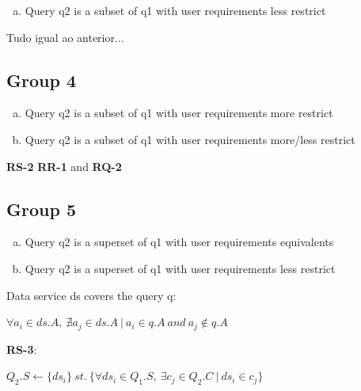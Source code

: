 \begin{enumerate}[b)]
\item Query q2 is a subset of q1 with user requirements less restrict
\end{enumerate}

\begin{definition}
Tudo igual ao anterior...
\end{definition}

\subsection{Group 4}

\begin{enumerate}[a)]
\item Query q2 is a subset of q1 with user requirements more restrict
\item Query q2 is a subset of q1 with user requirements more/less restrict
\end{enumerate}

\begin{definition}
\textbf{RS-2} \textbf{RR-1} and \textbf{RQ-2}
\end{definition}

\subsection{Group 5}
\begin{enumerate}[a)]
\item Query q2 is a superset of q1 with user requirements equivalents
\item Query q2 is a superset of q1 with user requirements less restrict
\end{enumerate}

\begin{definition}
Data service ds covers the query q: 
\begin{center}
$ \forall a_{i} \in ds.A,\ \nexists a_{j} \in ds.A \ \vert \ a_{i} \in q.A\ and\ a_{j} \notin q.A$
\end{center}
\end{definition}

\begin{definition}
\textbf{RS-3}:
\begin{flushleft}
$ Q_{2}.S \leftarrow \lbrace ds_{i} \rbrace\  st.\ \lbrace \forall ds_{i} \in Q_{1}.S,\ \exists c_{j} \in  Q_{2}.C\ \vert \ ds_{i} \in c_{j} \rbrace$ \\
\end{flushleft}
\end{definition}

